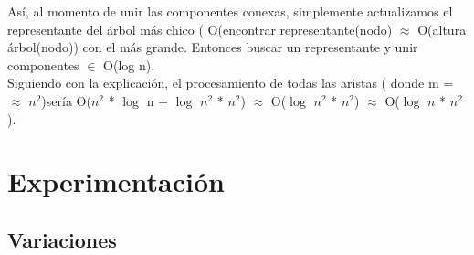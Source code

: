 \documentclass[11pt,a4paper]{article}
\begin{document}
Así, al momento de unir las componentes conexas, simplemente actualizamos el representante del árbol más chico ( O(encontrar representante(nodo) $\approx$ O(altura árbol(nodo)) con el más grande. Entonces buscar un representante y unir componentes $\in$ O(log n).
\\Siguiendo con la explicación, el procesamiento de todas las aristas ( donde m = $\approx$ $n^{2}$)sería O($n^2$ * $\log$ n + $\log$ $n^{2}$ * $n^{2}$) $\approx$ O($\log$ $n^{2}$ * $n^{2}$) $\approx$ O($\log$ $n$ * $n^{2}$).
\section{Experimentación}
\subsection{Variaciones}
\end{document}

